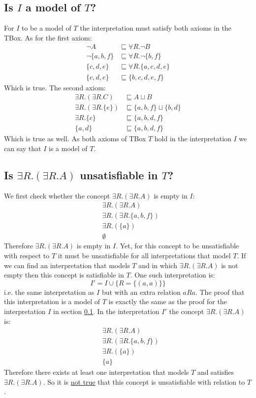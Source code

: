 \documentclass[a4paper,12pt]{article}
\begin{document}
\subsection[Model]{Is $I$ a model of $T$?}
\label{itproof}
For $I$ to be a model of $T$ the interpretation must satisfy both axioms in the
TBox.  As for the first axiom:
\begin{align*}
        \neg A &\sqsubseteq \forall R.\neg B\\
\neg \{a,b,f\} &\sqsubseteq \forall R.\neg \{b,f\}\\
     \{c,d,e\} &\sqsubseteq \forall R.\{a,c,d,e\}\\
     \{c,d,e\} &\sqsubseteq \{b,c,d,e,f\}
\end{align*}
Which is true.  The second axiom:
\begin{align*}
    \exists R.(\exists R.C) &\sqsubseteq A \sqcup B\\
\exists R.(\exists R.\{e\}) &\sqsubseteq \{a,b,f\} \sqcup \{b,d\}\\
            \exists R.\{c\} &\sqsubseteq \{a,b,d,f\}\\
                    \{a,d\} &\sqsubseteq \{a,b,d,f\}
\end{align*}
Which is true as well.  As both axioms of TBox $T$ hold in the interpretation
$I$ we can say that $I$ is a model of $T$.

\subsection[Satisfiability]{Is $\exists R.(\exists R.A)$ unsatisfiable in $T$?}
We first check whether the concept $ \exists R.(\exists R.A) $ is empty in $I$:
\begin{align*}
&\exists R.(\exists R.A)\\
&\exists R.(\exists R.\{a,b,f\})\\
&\exists R.(\{a\})\\
&\emptyset
\end{align*}
Therefore $ \exists R.(\exists R.A) $ is empty in $I$.  Yet, for this concept
to be unsatisfiable with respect to $T$ it must be unsatisfiable for all
interpretations that model $T$.  If we can find an interpretation that models
$T$ and in which $ \exists R.(\exists R.A) $ is not empty then this concept is
satisfiable in $T$.  One such interpretation is:
\begin{equation*}
I' = I \cup \{ R = \{(a,a)\} \}
\end{equation*}
i.e. the same interpretation as $I$ but with an extra relation $aRa$.  The
proof that this interpretation is a model of $T$ is exactly the same as the
proof for the interpretation $I$ in section \ref{itproof}.  In the
interpretation $I'$ the concept $ \exists R.(\exists R.A) $ is:
\begin{align*}
&\exists R.(\exists R.A)\\
&\exists R.(\exists R.\{a,b,f\})\\
&\exists R.(\{a\})\\
&\{a\}
\end{align*}
Therefore there exists at least one interpretation that models $T$ and
satisfies $ \exists R.(\exists R.A) $.  So it is \underline{not true} that this
concept is unsatisfiable with relation to $T$.
\end{document}
